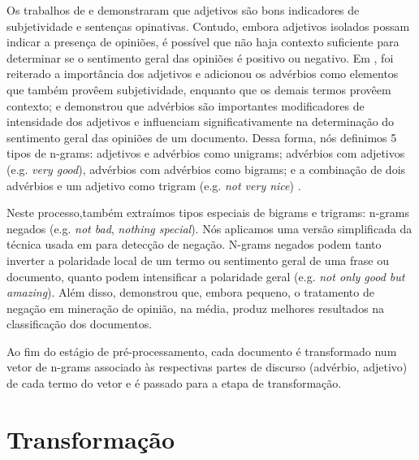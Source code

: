 Os trabalhos de  e \cite{wiebe2000learning} demonstraram que adjetivos são bons indicadores de subjetividade e sentenças opinativas. Contudo, embora adjetivos isolados possam indicar a presença de opiniões, é possível que não haja contexto suficiente para determinar se o sentimento geral das opiniões é positivo ou negativo. Em , foi reiterado a importância dos adjetivos e adicionou os advérbios como elementos que também provêem subjetividade, enquanto que os demais termos provêem contexto; e  demonstrou que advérbios são importantes modificadores de intensidade dos adjetivos e influenciam significativamente na determinação do sentimento geral das opiniões de um documento. Dessa forma, nós definimos 5 tipos de n-grams: adjetivos e advérbios como unigrams; advérbios com adjetivos (e.g. \textit{very good}), advérbios com advérbios como bigrams; e a combinação de dois advérbios e um adjetivo como trigram (e.g. \textit{not very nice}) \cite{pang2002thumbs, turney2002thumbs, taboada2008extracting, karamibekr2012verb}. 

Neste processo,também extraímos tipos especiais de bigrams e trigrams: n-grams negados (e.g. \textit{not bad}, \textit{nothing special}). Nós aplicamos uma versão simplificada da técnica usada em \cite{das2001yahoo} para detecção de negação. N-grams negados podem tanto inverter a polaridade local de um termo ou sentimento geral de uma frase ou documento, quanto podem intensificar a polaridade geral (e.g. \textit{not only good but amazing}). Além disso,  demonstrou que, embora pequeno, o tratamento de negação em mineração de opinião, na média, produz melhores resultados na classificação dos documentos. 

Ao fim do estágio de pré-processamento, cada documento é transformado num vetor de n-grams associado às respectivas partes de discurso (advérbio, adjetivo) de cada termo do vetor e é passado para a etapa de transformação.  

\section{Transformação}


